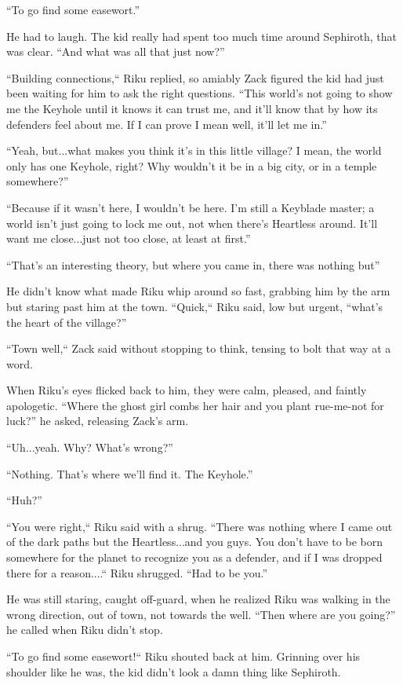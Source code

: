 ``To go find some easewort.''

He had to laugh. The kid really had spent too much time around Sephiroth, that was clear. ``And what was all that just now?''

``Building connections,`` Riku replied, so amiably Zack figured the kid had just been waiting for him to ask the right questions. ``This world's not going to show me the Keyhole until it knows it can trust me, and it'll know that by how its defenders feel about me. If I can prove I mean well, it'll let me in.''

``Yeah, but...what makes you think it's in this little village? I mean, the world only has one Keyhole, right? Why wouldn't it be in a big city, or in a temple somewhere?''

``Because if it wasn't here, I wouldn't be here. I'm still a Keyblade master; a world isn't just going to lock me out, not when there's Heartless around. It'll want me close...just not too close, at least at first.''

``That's an interesting theory, but where you came in, there was nothing but\textemdash ''

He didn't know what made Riku whip around so fast, grabbing him by the arm but staring past him at the town. ``Quick,`` Riku said, low but urgent, ``what's the heart of the village?''

``Town well,`` Zack said without stopping to think, tensing to bolt that way at a word.

When Riku's eyes flicked back to him, they were calm, pleased, and faintly apologetic. ``Where the ghost girl combs her hair and you plant rue-me-not for luck?'' he asked, releasing Zack's arm.

``Uh...yeah. Why? What's wrong?''

``Nothing. That's where we'll find it. The Keyhole.''

``Huh?''

``You were right,`` Riku said with a shrug. ``There was nothing where I came out of the dark paths but the Heartless...and you guys. You don't have to be born somewhere for the planet to recognize you as a defender, and if I was dropped there for a reason....`` Riku shrugged. ``Had to be you.''

He was still staring, caught off-guard, when he realized Riku was walking in the wrong direction, out of town, not towards the well. ``Then where are you going?'' he called when Riku didn't stop.

``To go find some easewort!`` Riku shouted back at him. Grinning over his shoulder like he was, the kid didn't look a damn thing like Sephiroth.

